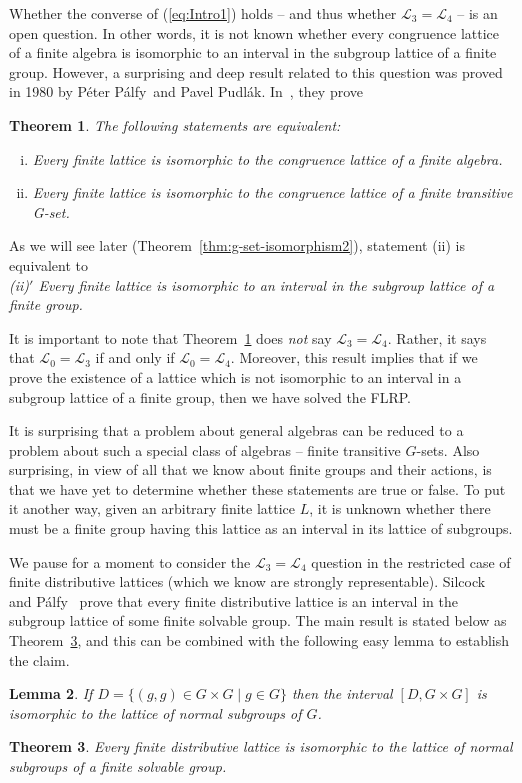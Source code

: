 \documentclass[cm,dissertation,actual,final]{uhthesis}
\theoremstyle{plain}
\newtheorem{theorem}{Theorem}[section]
\newtheorem{lemma}[theorem]{Lemma}
\theoremstyle{definition}
\newcounter{claim}
\theoremstyle{remark}
\numberwithin{theorem}{section}
\numberwithin{claim}{chapter}
\numberwithin{equation}{section}
\numberwithin{conjecture}{chapter}
\newcommand{\Palfy}{P\'alfy}
\newcommand{\Pudlak}{Pudl\'ak}
\newcommand{\<}{\ensuremath{\langle}}
\renewcommand{\>}{\ensuremath{\rangle}}
\newcommand{\FLRP}{{\small FLRP}}
\newcommand{\0}{\ensuremath{\mathbf{0}}}
\newcommand{\1}{\ensuremath{\mathbf{1}}}
\newcommand{\2}{\ensuremath{\mathbf{2}}}
\newcommand{\3}{\ensuremath{\mathbf{3}}}
\newcommand{\4}{\ensuremath{\mathbf{4}}}
\newcommand{\5}{\ensuremath{\mathbf{5}}}
\newcommand{\sL}{\ensuremath{\mathscr{L}}}
\begin{document}
Whether the converse of (\ref{eq:Intro1}) holds -- and thus whether 
$\sL_3 = \sL_4$ -- is an open question.  In other words, it is not known whether
every congruence lattice of a finite algebra is isomorphic to an interval in the
subgroup lattice of a finite group.
However, a surprising and deep result related to this question was proved in
1980 by 
%
%
P\'eter \Palfy\ and Pavel \Pudlak.
In~\cite{Palfy:1980}, they prove 
\begin{theorem}
\label{thm:IntroP5}
The following statements are equivalent:
\begin{enumerate}[(i)]
\item Every finite lattice is isomorphic to
  the congruence lattice of a finite algebra.
\item Every finite lattice is isomorphic to the congruence lattice of a finite transitive G-set.
\end{enumerate}
\end{theorem}
As we will see later (Theorem~\ref{thm:g-set-isomorphism2}), statement (ii) is equivalent to
\\[4pt]
{\it (ii)${}'$ Every finite lattice is isomorphic to an interval in the subgroup lattice of a finite group.}

It is important to note that Theorem~\ref{thm:IntroP5} does \emph{not} say
$\sL_3 = \sL_4$.  Rather, it says that $\sL_0 = \sL_3$ if and only if
$\sL_0=\sL_4$.  Moreover, this result implies that if we prove the existence of a lattice
which is not isomorphic to an interval in a subgroup lattice of a finite group,
then we have solved the \FLRP. 

It is surprising that a problem about general algebras can be reduced to
a problem about such a special class of algebras -- finite transitive
$G$-sets.  Also surprising, in view of all that we know about 
finite groups and their actions, is that we have
yet to determine whether these statements are true or false.
To put it another way, given an arbitrary finite lattice $L$, 
it is unknown whether there must be a finite group having this lattice as an
interval in its lattice of subgroups.  

%
We pause for a moment to consider the $\sL_3 = \sL_4$ question in the restricted 
case of finite distributive lattices (which we know are strongly
representable).  
Silcock~\cite{Silcock:1977} and \Palfy~\cite{Palfy:1987} prove that 
every finite distributive lattice is an interval in the subgroup lattice of some
finite solvable group.  The main result is stated below as
Theorem~\ref{thm:diag-normals}, and this can be combined with the
following easy lemma to establish the claim. 
\begin{lemma}
\label{lem:diag-normals}
If $D = \{(g,g) \in G \times G \mid g\in G\}$ then the interval $[D, G \times G]$ is isomorphic to the
lattice of normal subgroups of $G$.
\end{lemma}
\begin{theorem}
\label{thm:diag-normals}
Every finite distributive lattice is isomorphic to the lattice of normal subgroups
of a finite solvable group.
\end{theorem}
\end{document}

